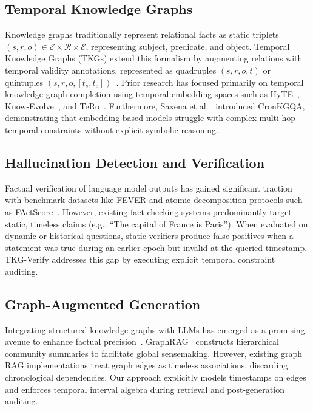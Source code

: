 \documentclass[conference]{IEEEtran}
\begin{document}
\subsection{Temporal Knowledge Graphs}
Knowledge graphs traditionally represent relational facts as static triplets $(s, r, o) \in \mathcal{E} \times \mathcal{R} \times \mathcal{E}$, representing subject, predicate, and object. Temporal Knowledge Graphs (TKGs) extend this formalism by augmenting relations with temporal validity annotations, represented as quadruples $(s, r, o, t)$ or quintuples $(s, r, o, [t_s, t_e])$~\cite{boschee2015icews, leblay2018deriving}. Prior research has focused primarily on temporal knowledge graph completion using temporal embedding spaces such as HyTE~\cite{dasgupta2018hyte}, Know-Evolve~\cite{trivedi2017know}, and TeRo~\cite{xu2020tero}. Furthermore, Saxena et al.~\cite{saxena2021question} introduced CronKGQA, demonstrating that embedding-based models struggle with complex multi-hop temporal constraints without explicit symbolic reasoning.

\subsection{Hallucination Detection and Verification}
Factual verification of language model outputs has gained significant traction with benchmark datasets like FEVER and atomic decomposition protocols such as FActScore~\cite{min2023factscore}. However, existing fact-checking systems predominantly target static, timeless claims (e.g., ``The capital of France is Paris''). When evaluated on dynamic or historical questions, static verifiers produce false positives when a statement was true during an earlier epoch but invalid at the queried timestamp. TKG-Verify addresses this gap by executing explicit temporal constraint auditing.

\subsection{Graph-Augmented Generation}
Integrating structured knowledge graphs with LLMs has emerged as a promising avenue to enhance factual precision~\cite{yasunaga2021qa, baek2023knowledge, sun2024think}. GraphRAG~\cite{edge2024graphrag} constructs hierarchical community summaries to facilitate global sensemaking. However, existing graph RAG implementations treat graph edges as timeless associations, discarding chronological dependencies. Our approach explicitly models timestamps on edges and enforces temporal interval algebra during retrieval and post-generation auditing.
\end{document}
